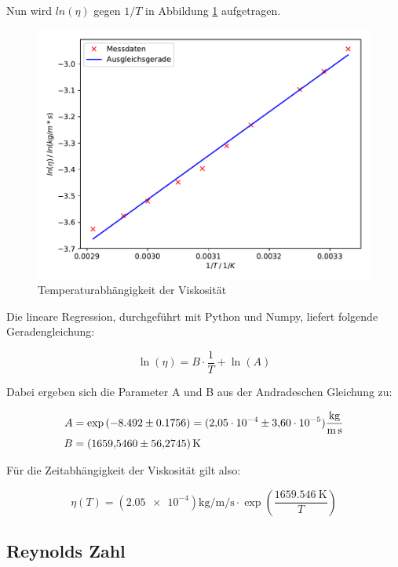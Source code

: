 Nun wird $ln(\eta)$ gegen $1/T$ in Abbildung \ref{fig:plot} aufgetragen.

\begin{figure}
  \centering
  \includegraphics[scale=0.7]{content/plot1.pdf}
  \caption{Temperaturabhängigkeit der Viskosität}
  \label{fig:plot}
\end{figure}

Die lineare Regression, durchgeführt mit Python und Numpy, 
liefert folgende Geradengleichung: 

\begin{equation*}
\ln{(\eta)} = B\cdot \frac{1}{T} + \ln{(A)}
\end{equation*}

Dabei ergeben sich die Parameter A und B aus der Andradeschen Gleichung zu: 

\begin{align*}
A &= \exp{(-8.492\pm0.1756)} = (\num{2.05e-4}\pm\num{3.60e-5})\si{\kilo\gram\per\meter\per\second} \\
B &= \SI{1659.546+-56.2745}{\kelvin}
\end{align*}

Für die Zeitabhängigkeit der Viskosität gilt also:

\begin{equation*}
\eta (T) = (\num{2.05e-4})\si{\kilo\gram\per\meter\per\second} \cdot \exp{\left(\frac{\SI{1659.546}{\kelvin}}{T}\right)}
\end{equation*}

\subsection{Reynolds Zahl}

